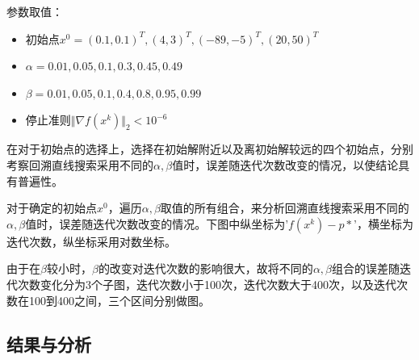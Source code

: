 \documentclass{article}
\begin{document}
参数取值：
\begin{itemize}
    \item 初始点$x^0=(0.1,0.1)^T,(4,3)^T,(-89,-5)^T,(20,50)^T$
    \item $\alpha=0.01,0.05,0.1,0.3,0.45,0.49$
    \item $\beta=0.01,0.05,0.1,0.4,0.8,0.95,0.99$
    \item 停止准则$\Vert \nabla f(x^{k}) \Vert_2<10^{-6}$
\end{itemize}


在对于初始点的选择上，选择在初始解附近以及离初始解较远的四个初始点，分别考察回溯直线搜索采用不同的$\alpha,\beta$值时，误差随迭代次数改变的情况，以使结论具有普遍性。

对于确定的初始点$x^0$，遍历$\alpha,\beta $取值的所有组合，来分析回溯直线搜索采用不同的$\alpha,\beta$值时，误差随迭代次数改变的情况。下图中纵坐标为'$f(x^k)-p\ast$'，横坐标为迭代次数，纵坐标采用对数坐标。

由于在$\beta$较小时，$\beta$的改变对迭代次数的影响很大，故将不同的$\alpha,\beta$组合的误差随迭代次数变化分为3个子图，迭代次数小于100次，迭代次数大于400次，以及迭代次数在100到400之间，三个区间分别做图。



\subsection{结果与分析}
\end{document}
